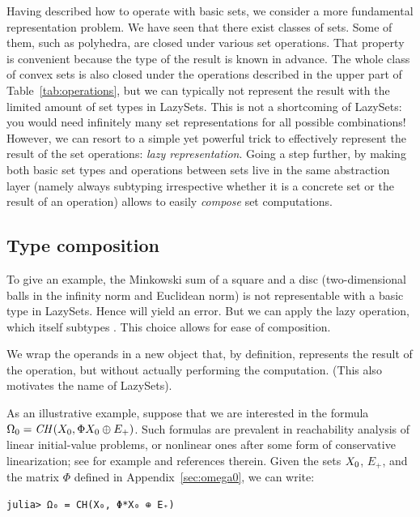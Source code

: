 Having described how to operate with basic sets, we consider a more fundamental representation problem.
%
We have seen that there exist classes of sets.
Some of them, such as polyhedra, are closed under various set operations. That property is convenient because the type of the result is known in advance.
%
The whole class of convex sets is also closed under the operations described in the upper part of Table~\ref{tab:operations}, but we can typically not represent the result with the limited amount of set types in LazySets. This is not a shortcoming of LazySets: you would need infinitely many set representations for all possible combinations! However, we can resort to a simple yet powerful trick to effectively represent the result of the set operations: \emph{lazy representation}.
%
Going a step further, by making both basic set types and operations between sets live in the same abstraction layer (namely always subtyping  irrespective whether it is a concrete set or the result of an operation) allows to easily \emph{compose} set computations.


\subsection{Type composition} \label{sec:composition}

To give an example, the Minkowski sum of a square and a disc (two-dimensional balls in the infinity norm and Euclidean norm) is not representable with a basic type in LazySets. Hence  will yield an error. But we can apply the lazy  operation, which itself subtypes . This choice allows for ease of composition.

We wrap the operands in a new object that, by definition, represents the result of the operation, but without actually performing the computation. (This also motivates the name of LazySets).

\smallskip

As an illustrative example, suppose that we are interested in the formula $\Omega_0 = \mathit{CH}(X_0, \Phi X_0 \oplus E_+)$. Such formulas are prevalent in reachability analysis of linear initial-value problems, or nonlinear ones after some form of conservative linearization; see for example \cite{althoff2020set} and references therein. Given the sets $X_0$, $E_+$, and the matrix $\Phi$ defined in Appendix~\ref{sec:omega0}, we can write:

\begin{minipage}{\linewidth}
\begin{lstlisting}
julia> Ω₀ = CH(X₀, Φ*X₀ ⊕ E₊)
\end{lstlisting}
\end{minipage}

